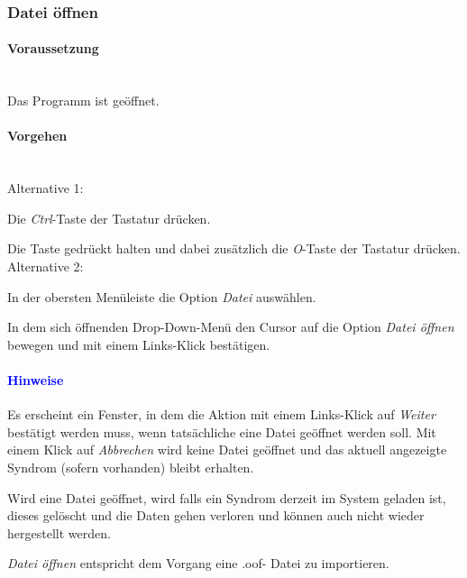 \documentclass[enabledeprecatedfontcommands,fontsize=11pt,paper=a4,twoside]{scrartcl}
\newcounter{one}
\newcounter{two}[one]
\newcommand*{\hint}{\paragraph{\textcolor{blue}{Hinweise}}}
\newcommand*{\condition}{\paragraph{Voraussetzung}$\;$ \vspace{0.2cm}\\}
\newcommand*{\actions}{\paragraph{Vorgehen} $\;$\vspace{0.2cm}\\}
\newcommand*{\aOne}{\textcolor{bbe}{Alternative 1:}}
\newcommand*{\aTwo}{\textcolor{bbe}{Alternative 2:}}
\let\tempone\itemize
\let\temptwo\enditemize
\renewenvironment{itemize}{\tempone\addtolength{\itemsep}{-10.0pt}}{\temptwo}
\let\origenumerate\enumerate
\let\origendenumerate\endenumerate
\renewenvironment{enumerate}{\origenumerate \addtolength{\itemsep}{-10.0pt}}{\origendenumerate}
\begin{document}
						
\subsubsection{Datei öffnen}
		\condition 	
		Das Programm ist geöffnet.
		\actions
		\aOne
		\begin{enumerate}
				\item Die \textit{Ctrl}-Taste der Tastatur drücken.
				\item Die Taste gedrückt halten und dabei zusätzlich die \textit{O}-Taste der Tastatur drücken.
		\end{enumerate}				
		\aTwo
		\begin{enumerate}
				\item In der obersten Menüleiste die Option \textit{Datei} auswählen. 
				\item In dem sich öffnenden Drop-Down-Menü den Cursor auf die Option \textit{Datei öffnen} bewegen und mit einem Links-Klick bestätigen.
		\end{enumerate}		
		\hint
		\begin{itemize}
				\item Es erscheint ein Fenster, in dem die Aktion mit einem Links-Klick auf \textit{Weiter} bestätigt werden muss, wenn tatsächliche eine Datei geöffnet werden soll. Mit einem Klick auf \textit{Abbrechen} wird keine Datei geöffnet und das aktuell angezeigte Syndrom (sofern vorhanden) bleibt erhalten.
				\item  Wird eine Datei geöffnet, wird falls ein Syndrom derzeit im System geladen ist, dieses gelöscht und die Daten gehen verloren und können auch nicht wieder hergestellt werden. 
				\item \textit{Datei öffnen} entspricht dem Vorgang eine .oof- Datei zu importieren. \\
		\end{itemize}

\end{document}
